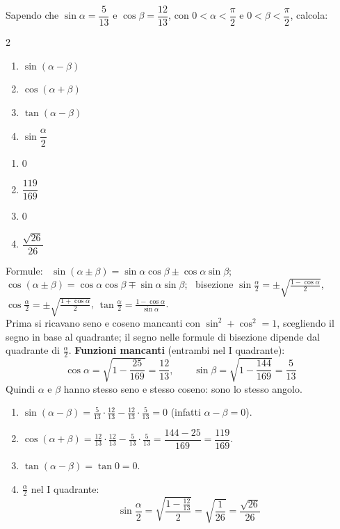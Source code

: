 \begin{question}[ID=1.3, subtitle={Formule di addizione con $\sin\alpha=5/13$ e $\cos\beta=12/13$}, tags={goniometria, formule di addizione}, difficulty=media]
Sapendo che $\sin \alpha = \dfrac{5}{13}$ e $\cos \beta = \dfrac{12}{13}$, con $0 < \alpha < \dfrac{\pi}{2}$ e $0 < \beta < \dfrac{\pi}{2}$, calcola:
\begin{multicols}{2}
\begin{enumerate}
\item $\sin(\alpha - \beta)$
\item $\cos(\alpha + \beta)$
\item $\tan(\alpha - \beta)$
\item $\sin\dfrac{\alpha}{2}$
\end{enumerate}
\end{multicols}
\begin{solution}
\begin{enumerate}
    \item $0$
    \item $\dfrac{119}{169}$
    \item $0$
    \item $\dfrac{\sqrt{26}}{26}$
\end{enumerate}
\end{solution}
\begin{explanation}
Formule: \ $\sin(\alpha\pm\beta)=\sin\alpha\cos\beta\pm\cos\alpha\sin\beta$; \ $\cos(\alpha\pm\beta)=\cos\alpha\cos\beta\mp\sin\alpha\sin\beta$; \ bisezione $\sin\tfrac\alpha2=\pm\sqrt{\tfrac{1-\cos\alpha}{2}}$, $\cos\tfrac\alpha2=\pm\sqrt{\tfrac{1+\cos\alpha}{2}}$, $\tan\tfrac\alpha2=\tfrac{1-\cos\alpha}{\sin\alpha}$. \\
Prima si ricavano seno e coseno mancanti con $\sin^2+\cos^2=1$, scegliendo il segno in base al quadrante; il segno nelle formule di bisezione dipende dal quadrante di $\tfrac\alpha2$.
\textbf{Funzioni mancanti} (entrambi nel I quadrante):
\[ \cos\alpha=\sqrt{1-\dfrac{25}{169}}=\dfrac{12}{13}, \qquad \sin\beta=\sqrt{1-\dfrac{144}{169}}=\dfrac5{13} \]
Quindi $\alpha$ e $\beta$ hanno stesso seno e stesso coseno: sono lo stesso angolo.
\begin{enumerate}
    \item $\sin(\alpha-\beta)=\tfrac5{13}\cdot\tfrac{12}{13}-\tfrac{12}{13}\cdot\tfrac5{13}=0$ (infatti $\alpha-\beta=0$).
    \item $\cos(\alpha+\beta)=\tfrac{12}{13}\cdot\tfrac{12}{13}-\tfrac5{13}\cdot\tfrac5{13}=\dfrac{144-25}{169}=\dfrac{119}{169}$.
    \item $\tan(\alpha-\beta)=\tan0=0$.
    \item $\tfrac\alpha2$ nel I quadrante:
    \[ \sin\dfrac\alpha2=\sqrt{\dfrac{1-\frac{12}{13}}{2}}=\sqrt{\dfrac1{26}}=\dfrac{\sqrt{26}}{26} \]
\end{enumerate}
\end{explanation}
\end{question}

